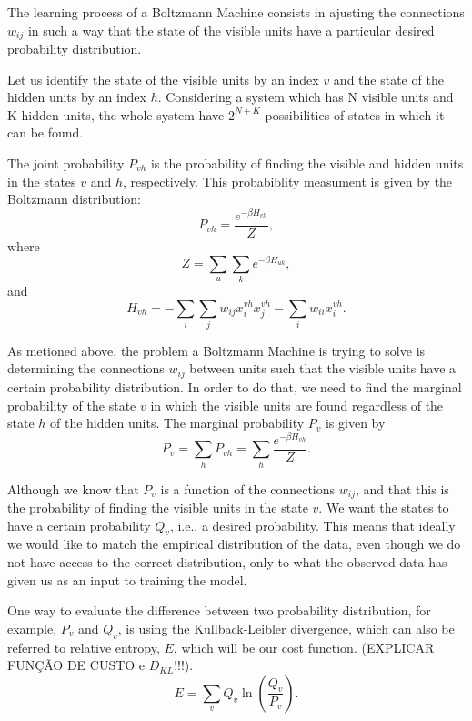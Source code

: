 The learning process of a Boltzmann Machine consists in ajusting the connections $w_{ij}$ in such a way that the state of the visible units have a particular desired probability distribution.

Let us identify the state of the visible units by an index $v$ and the state of the hidden units by an index $h$. 
Considering a system which has N visible units and K hidden units, the whole system have $2^{N + K}$ possibilities of states in which it can be found.

The joint probability $P_{v h}$ is the probability of finding the visible and hidden units in the states $v$ and $h$, respectively. 
This probabiblity measument is given by the Boltzmann distribution:
\begin{equation}
  P_{v h} = \frac{e^{-\beta H_{v h}}}{Z},
  \label{eq:eq8}
\end{equation}
where
\begin{equation}
  Z = \sum_{u} \sum_{k} e^{-\beta H_{u k}},
  \label{eq:eq9}
\end{equation}
and
\begin{equation}
  H_{v h} = - \sum_{i} \sum_{j} w_{ij} x^{v h}_{i} x^{v h}_{j} - \sum_{i} w_{ii} x^{v h}_{i}.
  \label{eq:eq10}
\end{equation}

As metioned above, the problem a Boltzmann Machine is trying to solve is determining the connections $w_{ij}$ between units such that the visible units have a certain probability distribution. 
In order to do that, we need to find the marginal probability of the state $v$ in which the visible units are found regardless of the state $h$ of the hidden units. The marginal probability $P_{v}$ is given by
\begin{equation}
  P_{v} = \sum_{h} P_{v h} = \sum_{h} \frac{e^{-\beta H_{v h}}}{Z}.
  \label{eq:marginal_prob}
\end{equation}

Although we know that $P_{v}$ is a function of the connections $w_{ij}$, and that this is the probability of finding the visible units in the state $v$. We want the states to have a certain probability $Q_{v}$, i.e., a desired probability. 
This means that ideally we would like to match the empirical distribution of the data, even though we do not have access to the correct distribution, only to what the observed data has given us as an input to training the model.

One way to evaluate the difference between two probability distribution, for example, $P_{v}$ and $Q_{v}$, is using the Kullback-Leibler divergence, which can also be referred to relative entropy, $E$, which will be our cost function. 
(EXPLICAR FUN\c{C}\~{A}O DE CUSTO e $D_{KL}$!!!).
\begin{equation}
  E = \sum_{v} Q_{v} \ln{\left(\frac{Q_{v}}{P_{v}}\right)}.
  \label{eq:DKL}
\end{equation}

